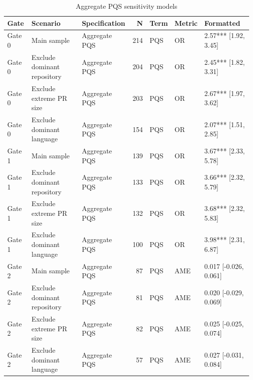 \begin{table}
\caption{Aggregate PQS sensitivity models}
\label{tab:pqs_sensitivity}
\begin{tabular}{lllrlll}
\toprule
Gate & Scenario & Specification & N & Term & Metric & Formatted \\
\midrule
Gate 0 & Main sample & Aggregate PQS & 214 & PQS & OR & 2.57*** [1.92, 3.45] \\
Gate 0 & Exclude dominant repository & Aggregate PQS & 204 & PQS & OR & 2.45*** [1.82, 3.31] \\
Gate 0 & Exclude extreme PR size & Aggregate PQS & 203 & PQS & OR & 2.67*** [1.97, 3.62] \\
Gate 0 & Exclude dominant language & Aggregate PQS & 154 & PQS & OR & 2.07*** [1.51, 2.85] \\
Gate 1 & Main sample & Aggregate PQS & 139 & PQS & OR & 3.67*** [2.33, 5.78] \\
Gate 1 & Exclude dominant repository & Aggregate PQS & 133 & PQS & OR & 3.66*** [2.32, 5.79] \\
Gate 1 & Exclude extreme PR size & Aggregate PQS & 132 & PQS & OR & 3.68*** [2.32, 5.83] \\
Gate 1 & Exclude dominant language & Aggregate PQS & 100 & PQS & OR & 3.98*** [2.31, 6.87] \\
Gate 2 & Main sample & Aggregate PQS & 87 & PQS & AME & 0.017 [-0.026, 0.061] \\
Gate 2 & Exclude dominant repository & Aggregate PQS & 81 & PQS & AME & 0.020 [-0.029, 0.069] \\
Gate 2 & Exclude extreme PR size & Aggregate PQS & 82 & PQS & AME & 0.025 [-0.025, 0.074] \\
Gate 2 & Exclude dominant language & Aggregate PQS & 57 & PQS & AME & 0.027 [-0.031, 0.084] \\
\bottomrule
\end{tabular}
\end{table}
